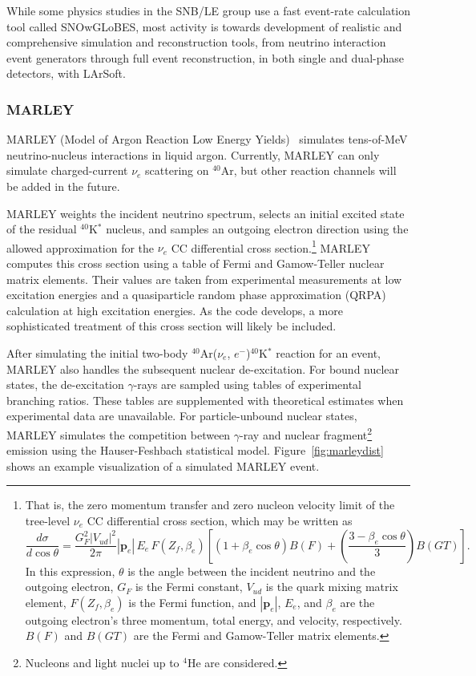 While
some physics studies in the SNB/LE group
 use a fast event-rate calculation tool called SNOwGLoBES, most
 activity is towards development of realistic and comprehensive
 simulation and reconstruction tools, from neutrino interaction event
 generators through full event reconstruction, in both single and
 dual-phase detectors, with LArSoft.


\subsubsection{MARLEY}

MARLEY (Model of Argon Reaction Low Energy Yields)~\cite{marley} simulates tens-of-MeV
neutrino-nucleus interactions in liquid argon. Currently, MARLEY can only
simulate charged-current $\nu_e$ scattering on $^{40}$Ar, but other
reaction channels will be added in the future.

MARLEY weights the incident neutrino spectrum, selects an initial excited state
of the residual $^{40}$K$^*$ nucleus, and samples an outgoing electron
direction using the allowed approximation for the $\nu_e$ CC differential cross
section.\footnote{That is, the zero momentum transfer and zero nucleon velocity
limit of the tree-level $\nu_e$ CC differential cross section, which may be
written as
\[
\frac{d\sigma}{d\cos \theta}
= \frac{G_F^2 |V_{ud}|^2}{2\pi} |\mathbf{p}_e|\, E_e \,F(Z_f, \beta_e)
\left[(1+\beta_e \cos\theta)B(F) + \left(\frac{3 - \beta_e \cos\theta}
{3}\right)B(GT)\right].
\]
In this expression, $\theta$ is the angle between the incident neutrino and the
outgoing electron, $G_F$ is the Fermi constant, $V_{ud}$ is the quark mixing
matrix element, $F(Z_f, \beta_e)$ is the Fermi function, and $|\mathbf{p}_e|$,
$E_e$, and $\beta_e$ are the outgoing electron's three momentum, total energy,
and velocity, respectively. $B(F)$ and $B(GT)$ are the Fermi and Gamow-Teller
matrix elements.
}
MARLEY computes this cross section using a table of Fermi and Gamow-Teller
nuclear matrix elements. Their values are taken from experimental measurements
at low excitation energies and a quasiparticle random phase approximation
(QRPA) calculation at high excitation energies. As the code develops, a more
sophisticated treatment of this cross section will likely be included.

After simulating the initial two-body $^{40}${Ar}($\nu_e$,
$e^{-}$)$^{40}$K$^*$ reaction for an event, MARLEY
also handles the subsequent nuclear de-excitation. For bound nuclear
states, the de-excitation $\gamma$-rays are sampled using tables of
experimental branching ratios. These tables are supplemented with
theoretical estimates when experimental data are unavailable. For
particle-unbound nuclear states, MARLEY simulates the competition between
$\gamma$-ray and nuclear fragment\footnote{ Nucleons and light nuclei up to
$^{4}${He} are considered.} emission using the Hauser-Feshbach
statistical model.   Figure~\ref{fig:marleydist} shows an example
visualization of a simulated MARLEY event.

